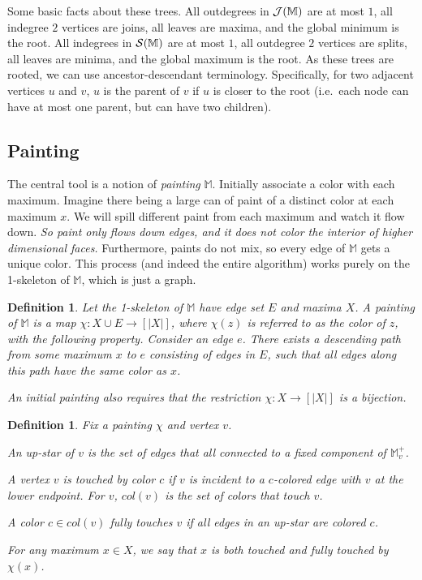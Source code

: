\documentclass[11pt]{article}
\newtheorem{definition}[theorem]{Definition}
\theoremstyle{definition}
\newcommand{\cJ}{{\cal J}}
\newcommand{\cS}{{\cal S}}
\newcommand{\MM}{\mathbb{M}}
\newcommand{\Sec}[1]{\hyperref[sec:#1]{\S\ref*{sec:#1}}} %
\newcommand{\col}{col}
\begin{document}
Some basic facts about these trees. 
All outdegrees in $\cJ(\MM)$ are at most $1$, all indegree $2$ vertices are joins, all leaves are maxima,
and the global minimum is the root. All indegrees in $\cS(\MM)$ are at most $1$, all outdegree $2$
vertices are splits, all leaves are minima, and the global maximum is the root.
As these trees are rooted, we can use ancestor-descendant terminology.  
Specifically, for two adjacent vertices $u$ and $v$, $u$ is the parent of $v$ if $u$ is closer to the root 
(i.e.\ each node can have at most one parent, but can have two children).  


\subsection{Painting}
The central tool is a notion 
of \emph{painting} $\MM$. Initially associate a color with each maximum. Imagine there being a large
can of paint of a distinct color at each maximum $x$. We will spill different paint from each maximum and watch it flow down.
\emph{So paint only flows down edges, and it does not color the interior of higher dimensional faces.} Furthermore, paints
do not mix, so every edge of $\MM$ gets a unique color. This process (and indeed the entire algorithm)
works purely on the 1-skeleton of $\MM$, which is just a graph.

\begin{definition} \label{def:paint2} Let the 1-skeleton of $\MM$ have edge set $E$ and maxima $X$.
A  \emph{painting} of $\MM$ is a map $\chi:X \cup E \to [|X|]$, where $\chi(z)$ is referred to as the \emph{color} of $z$,
with the following property. 
 Consider an edge $e$. There exists a descending path from some maximum $x$ to $e$
	consisting of edges in $E$, such that all edges along this path have the same color as $x$. 

An \emph{initial} painting also requires that the restriction $\chi:X \to [|X|]$ is a bijection.
\end{definition}

\begin{definition} \label{def:color-set} Fix a painting $\chi$ and vertex $v$.
\begin{asparaitem}
	 \item An \emph{up-star} of $v$ is the set of edges that all connected to a fixed component of $\MM^+_v$.
	 \item A vertex $v$ is \emph{touched by color $c$} if $v$ is incident to a $c$-colored
	 edge with $v$ at the lower endpoint. For $v$, $\col(v)$ is the set of colors that touch $v$.
	 \item A color $c \in \col(v)$ \emph{fully touches} $v$ if all edges in an up-star are colored $c$.
	 \item For any maximum $x\in X$, we say that $x$ is both touched and fully touched by $\chi(x)$.
\end{asparaitem}
\end{definition}
\end{document}
